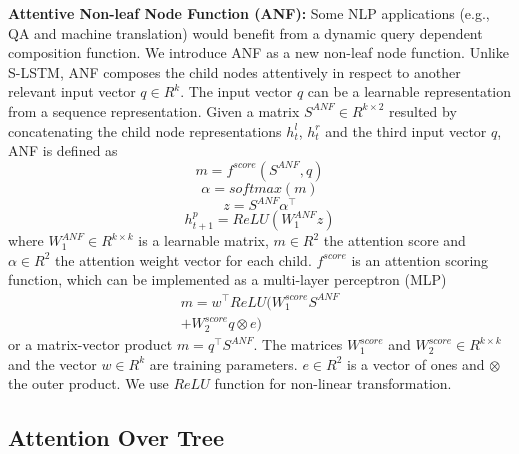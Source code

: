 \documentclass[11pt]{article}
\begin{document}
\textbf{Attentive Non-leaf Node Function (ANF):} Some NLP applications (e.g., QA and machine translation) would benefit from a dynamic query dependent composition function. We introduce ANF as a new non-leaf node function. Unlike S-LSTM, ANF composes the child nodes attentively in respect to another relevant input vector $q \in R^{k}$. The input vector $q$ can be a learnable representation from a sequence representation.
Given a matrix $S^{ANF} \in R^{k \times 2}$ resulted by concatenating the child node representations $h^l_t$, $h^r_t$ and the third input vector $q$, ANF is defined as
\begin{equation}
m=f^{score} (S^{ANF}, q)
\end{equation}
\begin{equation}
\alpha=softmax(m)
\end{equation}
\begin{equation}
z=S^{ANF} \alpha ^{\top}
\end{equation}
\begin{equation}
h^p_{t+1}=ReLU (W^{ANF}_1 z)
\end{equation}
where $W^{ANF}_1 \in R^{k \times k}$ is a learnable matrix, $m \in R^2$ the attention score and $\alpha \in R^2$ the attention weight vector for each child. $f^{score}$ is an attention scoring function, which can be implemented as a multi-layer perceptron (MLP)
\begin{multline}
m=w^{\top} ReLU (W^{score}_1 S^{ANF}  \\ + W^{score}_2 q \otimes e)
\end{multline}
or a matrix-vector product $m = q^{\top} S^{ANF} $. The matrices $W^{score}_1$ and $ W^{score}_2 \in R^{k \times k}$ and the vector $w \in R^{k}$ are training parameters. $e \in R^2$ is a vector of ones and $\otimes$ the outer product. We use $ReLU$ function for non-linear transformation.

\subsection{Attention Over Tree}
\end{document}
